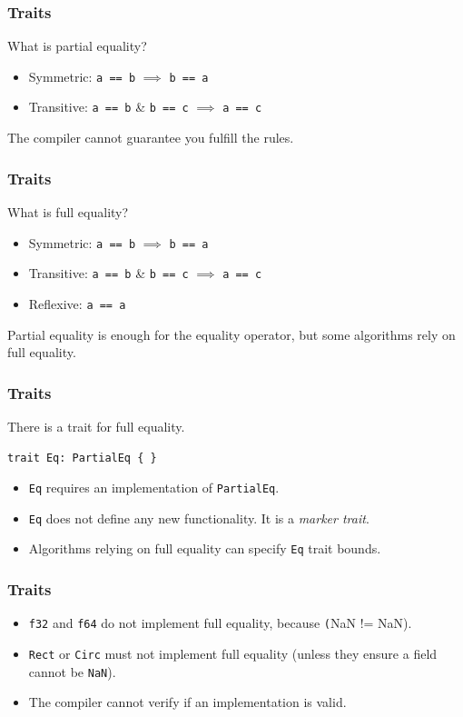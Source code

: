\begin{frame}[fragile]
    \frametitle{Traits}
    What is partial equality?
    \pause
    \vfill
    \begin{itemize}
        \item Symmetric: \texttt{a == b} $\implies$ \texttt{b == a}
        \item Transitive: \texttt{a == b} \& \texttt{b == c} $\implies$ \texttt{a == c}
    \end{itemize}
    \pause
    \vfill
    The compiler cannot guarantee you fulfill the rules.
\end{frame}

\begin{frame}[fragile]
    \frametitle{Traits}
    What is full equality?
    \pause
    \vfill
    \begin{itemize}
        \item Symmetric: \texttt{a == b} $\implies$ \texttt{b == a}
        \item Transitive: \texttt{a == b} \& \texttt{b == c} $\implies$ \texttt{a == c}
        \pause
        \item Reflexive: \texttt{a == a}
    \end{itemize}
    \pause
    \vfill
    Partial equality is enough for the equality operator, but some algorithms rely on full equality.
\end{frame}

\begin{frame}[fragile]
    \frametitle{Traits}
    There is a trait for full equality.
    \pause
    \vfill
    \begin{verbatim}
trait Eq: PartialEq { }
    \end{verbatim}
    \pause
    \vfill
    \begin{itemize}
        \item \texttt{Eq} requires an implementation of \texttt{PartialEq}.
        \item \texttt{Eq} does not define any new functionality. It is a \textit{marker trait}.
        \pause
        \item Algorithms relying on full equality can specify \texttt{Eq} trait bounds.
    \end{itemize}
\end{frame}

\begin{frame}[fragile]
    \frametitle{Traits}
    \begin{itemize}
        \item \texttt{f32} and \texttt{f64} do not implement full equality, because \texttt(NaN != NaN).
        \item \texttt{Rect} or \texttt{Circ} must not implement full equality (unless they ensure a field cannot be \texttt{NaN}).
        \pause
        \vspace{.3cm}
        \item The compiler cannot verify if an implementation is valid.
    \end{itemize}
\end{frame}

